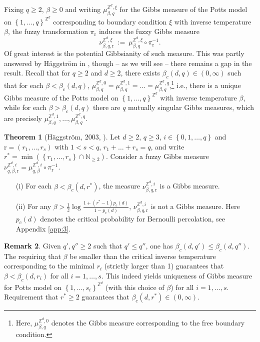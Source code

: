 \documentclass[12pt]{article}
\newcommand{\N}{\mathbb{N}}
\renewcommand{\r}{\mathrm{r}}
\newcommand{\Z}{\mathbb{Z}}
\newcommand{\set}[1]{\left\{#1\right\}}
\newcommand{\1}{\mathbbm{1}}
\newcommand{\5}{\vspace{0.5cm}}
\theoremstyle{definition}
\newtheorem{thm}{Theorem}[section]
\newtheorem{rem}[thm]{Remark}
\begin{document}
Fixing $q\geq 2$, $\beta\geq 0$ and writing $\mu_{\beta,q}^{\Z^d,\xi}$ for the Gibbs measure of the Potts model on $\set{1,\ldots,q}^{\Z^d}$ corresponding to boundary condition $\xi$ with inverse temperature $\beta$, the fuzzy transformation $\pi_\r$ induces the fuzzy Gibbs measure 
$$\nu_{\beta,q,\r}^{\Z^d,\xi} ~:=~ \mu_{\beta,q}^{\Z^d,\xi}\circ\pi_\r^{-1}.$$
Of great interest is the potential Gibbsianity of such measure. This was partly answered by H\"aggstr\"om in \cite{Hag}, though -- as we will see -- there remains a gap in the result. Recall that for $q\geq 2$ and $d\geq 2$, there exists $\beta_c(d,q)\in(0,\infty)$ such that for each $\beta<\beta_c(d,q)$, $\mu_{\beta,q}^{\Z^d,0}=\mu_{\beta,q}^{\Z^d,1}=\ldots=\mu_{\beta,q}^{\Z^d,q}$,\footnote{Here, $\mu_{\beta,q}^{\Z^d,0}$ denotes the Gibbs measure corresponding to the free boundary condition.} i.e., there is a unique Gibbs measure of the Potts model on $\set{1,\ldots,q}^{\Z^d}$ with inverse temperature $\beta$, while for each $\beta>\beta_c(d,q)$ there are $q$ mutually singular Gibbs measures, which are precisely $\mu_{\beta,q}^{\Z^d,1},\ldots,\mu_{\beta,q}^{\Z^d,q}$.

\begin{thm}[H\"aggstr\"om, 2003, \cite{Hag}]\label{Haggstrom}
Let $d\geq 2$, $q\geq 3$, $i\in\set{0,1,\ldots,q}$ and $\r=(r_1,\ldots,r_s)$ with $1<s<q$, $r_1+\ldots+r_s=q$, and write $r^*=\min(\set{r_1,\ldots,r_s}\cap\N_{\geq 2})$. Consider a fuzzy Gibbs measure $\nu_{q,\beta,\r}^{\Z^d,i}=\mu_{q,\beta}^{\Z^d,i}\circ\pi_{\r}^{-1}$.
\begin{itemize}
	\item[(i)] For each $\beta<\beta_c(d,r^*)$, the measure $\nu_{\beta,q,\r}^{\Z^d,i}$ is a Gibbs measure.
	\item[(ii)] For any $\beta>\frac{1}{2}\log\frac{1+(r^*-1)p_c(d)}{1-p_c(d)}$, $\nu_{\beta,q,\r}^{\Z^d,i}$ is not a Gibbs measure. Here $p_c(d)$ denotes the critical probability for Bernoulli percolation, see Appendix \ref{app:3}.
\end{itemize}
\end{thm}

\begin{rem}
Given $q',q''\geq 2$ such that $q'\leq q''$, one has $\beta_c(d,q')\leq\beta_c(d,q'')$. The requiring that $\beta$ be smaller than the critical inverse temperature corresponding to the minimal $r_i$ (strictly larger than 1) guarantees that $\beta<\beta_c(d,r_i)$ for all $i=1,\ldots,s$. This indeed yields uniqueness of Gibbs measure for Potts model on $\set{1,\ldots,s_i}^{\Z^d}$ (with this choice of $\beta$) for all $i=1,\ldots,s$. Requirement that $r^*\geq 2$ guarantees that $\beta_c(d,r^*)\in(0,\infty)$.
\end{rem}
\end{document}
